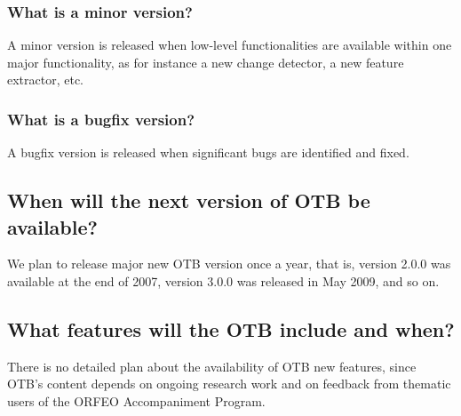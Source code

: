 \subsubsection{What is a minor version?}
A minor version is released when low-level functionalities are
available within one major functionality, as for instance a new
change detector, a new feature extractor, etc.

\subsubsection{What is a bugfix version?}
A bugfix version is released when significant bugs are identified and fixed.

\subsection{When will the next version of OTB be available?}
We plan to release major new OTB version once a year, that is, version
2.0.0 was available at the end of 2007, version 3.0.0 was released
in May 2009, and so on.

\subsection{What features will the OTB include and when?}
There is no detailed plan about the availability of OTB new features,
since OTB's content depends on ongoing research work and on feedback
from thematic users of the ORFEO Accompaniment Program.

